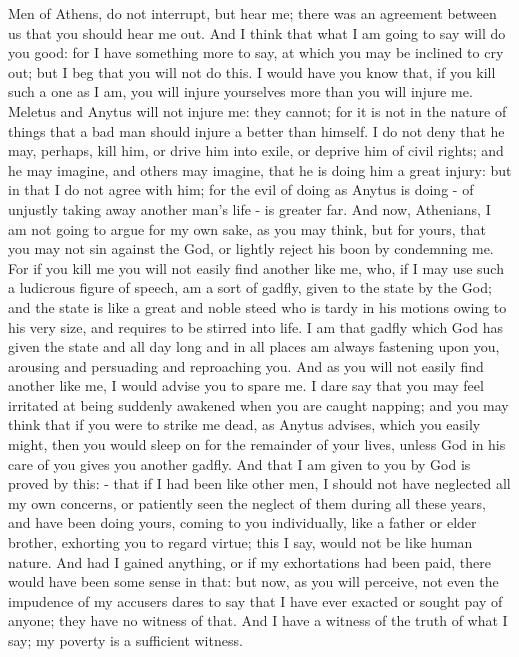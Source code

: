Men of Athens, do not interrupt, but hear me; there was an agreement
between us that you should hear me out. And I think that what I am
going to say will do you good: for I have something more to say, at
which you may be inclined to cry out; but I beg that you will not
do this. I would have you know that, if you kill such a one as I am,
you will injure yourselves more than you will injure me. Meletus and
Anytus will not injure me: they cannot; for it is not in the nature
of things that a bad man should injure a better than himself. I do
not deny that he may, perhaps, kill him, or drive him into exile,
or deprive him of civil rights; and he may imagine, and others may
imagine, that he is doing him a great injury: but in that I do not
agree with him; for the evil of doing as Anytus is doing - of unjustly
taking away another man's life - is greater far. And now, Athenians,
I am not going to argue for my own sake, as you may think, but for
yours, that you may not sin against the God, or lightly reject his
boon by condemning me. For if you kill me you will not easily find
another like me, who, if I may use such a ludicrous figure of speech,
am a sort of gadfly, given to the state by the God; and the state
is like a great and noble steed who is tardy in his motions owing
to his very size, and requires to be stirred into life. I am that
gadfly which God has given the state and all day long and in all places
am always fastening upon you, arousing and persuading and reproaching
you. And as you will not easily find another like me, I would advise
you to spare me. I dare say that you may feel irritated at being suddenly
awakened when you are caught napping; and you may think that if you
were to strike me dead, as Anytus advises, which you easily might,
then you would sleep on for the remainder of your lives, unless God
in his care of you gives you another gadfly. And that I am given to
you by God is proved by this: - that if I had been like other men,
I should not have neglected all my own concerns, or patiently seen
the neglect of them during all these years, and have been doing yours,
coming to you individually, like a father or elder brother, exhorting
you to regard virtue; this I say, would not be like human nature.
And had I gained anything, or if my exhortations had been paid, there
would have been some sense in that: but now, as you will perceive,
not even the impudence of my accusers dares to say that I have ever
exacted or sought pay of anyone; they have no witness of that. And
I have a witness of the truth of what I say; my poverty is a sufficient
witness. 


